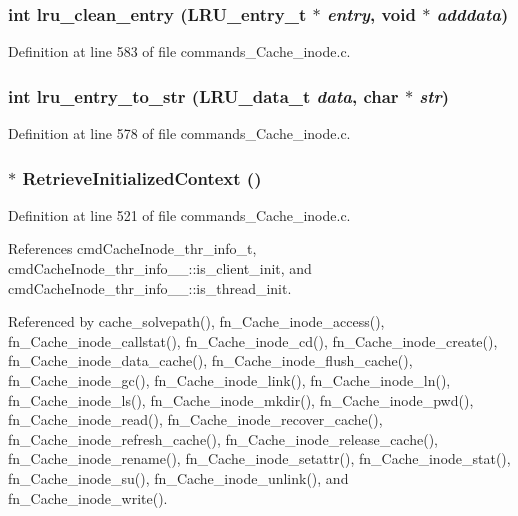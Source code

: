 \subsubsection{\setlength{\rightskip}{0pt plus 5cm}int lru\_\-clean\_\-entry (LRU\_\-entry\_\-t $\ast$ {\em entry}, void $\ast$ {\em adddata})}\label{commands__Cache__inode_8c_a24}




Definition at line 583 of file commands\_\-Cache\_\-inode.c.
\subsubsection{\setlength{\rightskip}{0pt plus 5cm}int lru\_\-entry\_\-to\_\-str (LRU\_\-data\_\-t {\em data}, char $\ast$ {\em str})}\label{commands__Cache__inode_8c_a23}




Definition at line 578 of file commands\_\-Cache\_\-inode.c.
\subsubsection{$\ast$ Retrieve\-Initialized\-Context ()}\label{commands__Cache__inode_8c_a21}




Definition at line 521 of file commands\_\-Cache\_\-inode.c.

References cmd\-Cache\-Inode\_\-thr\_\-info\_\-t, cmd\-Cache\-Inode\_\-thr\_\-info\_\-\_\-::is\_\-client\_\-init, and cmd\-Cache\-Inode\_\-thr\_\-info\_\-\_\-::is\_\-thread\_\-init.

Referenced by cache\_\-solvepath(), fn\_\-Cache\_\-inode\_\-access(), fn\_\-Cache\_\-inode\_\-callstat(), fn\_\-Cache\_\-inode\_\-cd(), fn\_\-Cache\_\-inode\_\-create(), fn\_\-Cache\_\-inode\_\-data\_\-cache(), fn\_\-Cache\_\-inode\_\-flush\_\-cache(), fn\_\-Cache\_\-inode\_\-gc(), fn\_\-Cache\_\-inode\_\-link(), fn\_\-Cache\_\-inode\_\-ln(), fn\_\-Cache\_\-inode\_\-ls(), fn\_\-Cache\_\-inode\_\-mkdir(), fn\_\-Cache\_\-inode\_\-pwd(), fn\_\-Cache\_\-inode\_\-read(), fn\_\-Cache\_\-inode\_\-recover\_\-cache(), fn\_\-Cache\_\-inode\_\-refresh\_\-cache(), fn\_\-Cache\_\-inode\_\-release\_\-cache(), fn\_\-Cache\_\-inode\_\-rename(), fn\_\-Cache\_\-inode\_\-setattr(), fn\_\-Cache\_\-inode\_\-stat(), fn\_\-Cache\_\-inode\_\-su(), fn\_\-Cache\_\-inode\_\-unlink(), and fn\_\-Cache\_\-inode\_\-write().

